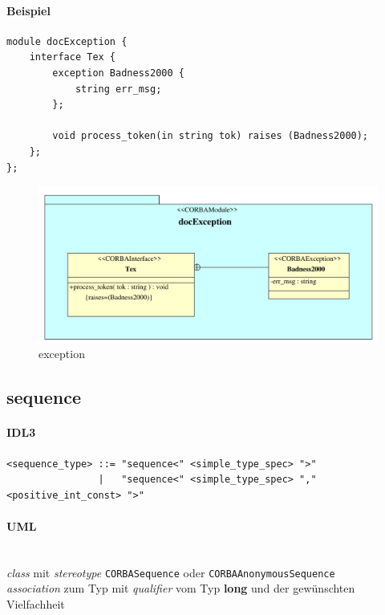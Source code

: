 \documentclass [a4paper,10pt] {scrartcl}
\begin{document}
\paragraph{Beispiel}
\begin{verbatim}
module docException {
    interface Tex {
        exception Badness2000 {
            string err_msg;
        };

        void process_token(in string tok) raises (Badness2000);
    };
};
\end{verbatim}
\begin{figure}[!h]
\centerline{\includegraphics[width=\linewidth]{docException}}
\caption{exception}
\label{fig:exception}
\end{figure}

\cleardoublepage
\subsection{sequence}
\paragraph{IDL3}
\begin{verbatim}
<sequence_type> ::= "sequence<" <simple_type_spec> ">"
                |   "sequence<" <simple_type_spec> "," <positive_int_const> ">"
\end{verbatim}
\paragraph{UML}~\\
\emph{class} mit \emph{stereotype} \texttt{CORBASequence} oder \texttt{CORBAAnonymousSequence}\\
\emph{association} zum Typ mit \emph{qualifier} vom Typ \textbf{long} und der gew{\"u}nschten Vielfachheit\\
\end{document}
